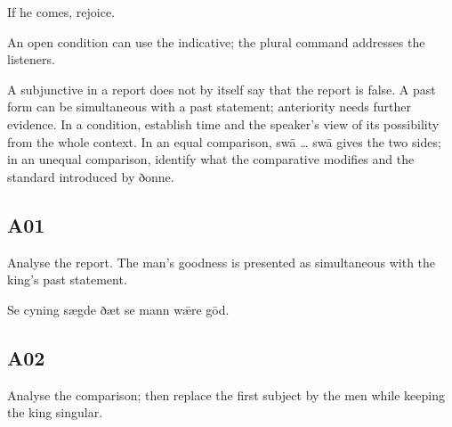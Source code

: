 If he comes, rejoice.

An open condition can use the indicative; the plural command addresses the listeners.

A subjunctive in a report does not by itself say that the report is false. A past form can be simultaneous with a past statement; anteriority needs further evidence. In a condition, establish time and the speaker’s view of its possibility from the whole context. In an equal comparison, swā … swā gives the two sides; in an unequal comparison, identify what the comparative modifies and the standard introduced by ðonne.

\subsection*{A01}

Analyse the report. The man’s goodness is presented as simultaneous with the king’s past statement.

Se cyning sægde ðæt se mann wǣre gōd.




\subsection*{A02}

Analyse the comparison; then replace the first subject by the men while keeping the king singular.

